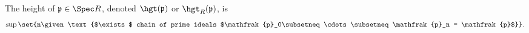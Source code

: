 The height of $\mathfrak{p}\in \Spec R$, denoted $\hgt(\mathfrak{p})$ or
$\hgt_R(\mathfrak{p})$, is
\[ \sup \set{n\given\text{$\exists$ chain of prime ideals $\mathfrak{p}_0\subsetneq \cdots\subsetneq \mathfrak{p}_n = \mathfrak{p}$}}. \]

